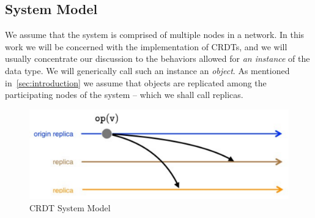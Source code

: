 
\subsection{System Model}
\label{sec:sys-model}

We assume that the system is comprised of multiple nodes in a network.
In this work we will be concerned with the implementation of CRDTs,
and we will usually concentrate our discussion to the behaviors
allowed for \emph{an instance} of the data type.
We will generically call such an instance an \emph{object}.
As mentioned in~\autoref{sec:introduction} we assume that objects are
replicated among the participating nodes of the system -- which we
shall call replicas.

\begin{figure}[t]
  \centering
  \includegraphics[scale=.4]{figures/sys-mod}
  \caption{CRDT System Model}
  \label{fig:sys-mod}
\end{figure}

